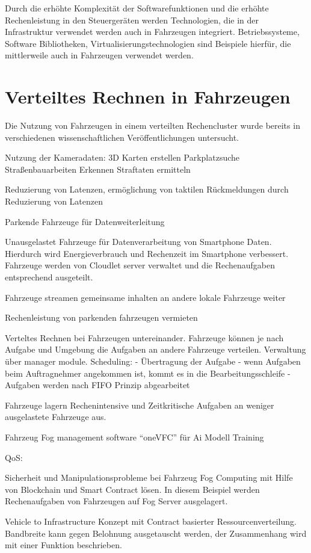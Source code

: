 Durch die erhöhte Komplexität der Softwarefunktionen und die erhöhte Rechenleistung in den Steuergeräten werden Technologien, die in der  Infrastruktur verwendet werden auch in Fahrzeugen integriert. Betriebssysteme, Software Bibliotheken, Virtualisierungstechnologien sind Beispiele hierfür, die mittlerweile auch in Fahrzeugen verwendet werden.

\section{Verteiltes Rechnen in Fahrzeugen}

Die Nutzung von Fahrzeugen in einem verteilten Rechencluster wurde bereits in verschiedenen wissenschaftlichen Veröffentlichungen untersucht. 

Nutzung der Kameradaten:
 3D Karten erstellen
 Parkplatzsuche
 Straßenbauarbeiten Erkennen
 Straftaten ermitteln \cite{Zhu2018}

Reduzierung von Latenzen, ermöglichung von taktilen Rückmeldungen durch Reduzierung von Latenzen \cite{Mukherjee2020}

Parkende Fahrzeuge für Datenweiterleitung \cite{Malandrino2014} \cite{Liu2011}

Unausgelastet Fahrzeuge für Datenverarbeitung von Smartphone Daten. Hierdurch wird Energieverbrauch und Rechenzeit im Smartphone verbessert. Fahrzeuge werden von Cloudlet server verwaltet und die Rechenaufgaben entsprechend ausgeteilt. \cite{Zhang2015}

Fahrzeuge streamen gemeinsame inhalten an andere lokale Fahrzeuge weiter \cite{Kharel2019}

Rechenleistung von parkenden fahrzeugen vermieten\cite{Arif2012}

Verteltes Rechnen bei Fahrzeugen untereinander. Fahrzeuge können je nach Aufgabe und Umgebung die Aufgaben an andere Fahrzeuge verteilen. Verwaltung über manager module. 
Scheduling:
	- Übertragung der Aufgabe
	- wenn Aufgaben beim Auftragnehmer angekommen ist, kommt es in die Bearbeitungsschleife
	- Aufgaben werden nach FIFO Prinzip abgearbeitet\cite{Feng2017}

Fahrzeuge lagern Rechenintensive und Zeitkritische Aufgaben an weniger ausgelastete Fahrzeuge aus. \cite{Liao2019} \cite{Wu2020}


Fahrzeug Fog management software \enquote{oneVFC} für Ai Modell Training \cite{Phung2021}

QoS:

Sicherheit und Manipulationsprobleme bei Fahrzeug Fog Computing mit Hilfe von Blockchain und Smart Contract lösen. In diesem Beispiel werden Rechenaufgaben von Fahrzeugen auf Fog Server ausgelagert.\cite{Liao2021}

Vehicle to Infrastructure Konzept mit Contract basierter Ressourcenverteilung. Bandbreite kann gegen Belohnung ausgetauscht werden, der Zusammenhang wird mit einer Funktion beschrieben.\cite{Zhao2020}




